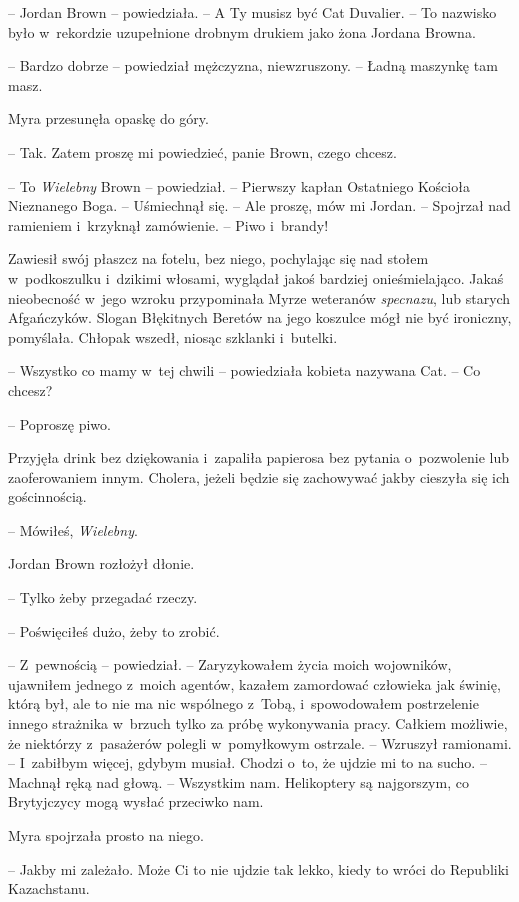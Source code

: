 \documentclass[oneside,polish,11pt,sfheadings]{mwbk}
\begin{document}
-- Jordan Brown -- powiedziała. -- A Ty musisz być Cat Duvalier. -- To
nazwisko było w~rekordzie uzupełnione drobnym drukiem jako żona Jordana
Browna.

-- Bardzo dobrze -- powiedział mężczyzna, niewzruszony. -- Ładną maszynkę
tam masz.

Myra przesunęła opaskę do góry. 

-- Tak. Zatem proszę mi powiedzieć, panie
Brown, czego chcesz.

-- To \textit{Wielebny }Brown -- powiedział. -- Pierwszy kapłan Ostatniego
Kościoła Nieznanego Boga. -- Uśmiechnął się. -- Ale proszę, mów mi Jordan.
-- Spojrzał nad ramieniem i~krzyknął zamówienie. -- Piwo i~brandy!

Zawiesił swój płaszcz na fotelu, bez niego, pochylając się nad stołem w~podkoszulku i~dzikimi włosami, wyglądał jakoś bardziej onieśmielająco.
Jakaś nieobecność w~jego wzroku przypominała Myrze weteranów
\textit{specnazu}, lub starych Afgańczyków. Slogan Błękitnych Beretów na
jego koszulce mógł nie być ironiczny, pomyślała. Chłopak wszedł, niosąc
szklanki i~butelki.

-- Wszystko co mamy w~tej chwili -- powiedziała kobieta nazywana Cat. -- Co
chcesz?

-- Poproszę piwo.

Przyjęła drink bez dziękowania i~zapaliła papierosa bez pytania o~pozwolenie lub zaoferowaniem innym. Cholera, jeżeli będzie się
zachowywać jakby cieszyła się ich gościnnością.

-- Mówiłeś, \textit{Wielebny}.

Jordan Brown rozłożył dłonie. 

-- Tylko żeby przegadać rzeczy.

-- Poświęciłeś dużo, żeby to zrobić.

-- Z~pewnością -- powiedział. -- Zaryzykowałem życia moich wojowników,
ujawniłem jednego z~moich agentów, kazałem zamordować człowieka jak
świnię, którą był, ale to nie ma nic wspólnego z~Tobą, i~spowodowałem
postrzelenie innego strażnika w~brzuch tylko za próbę wykonywania pracy.
Całkiem możliwie, że niektórzy z~pasażerów polegli w~pomyłkowym
ostrzale. -- Wzruszył ramionami. -- I~zabiłbym więcej, gdybym musiał.
Chodzi o~to, że ujdzie mi to na sucho. -- Machnął ręką nad głową. -- Wszystkim nam. Helikoptery są najgorszym, co Brytyjczycy mogą wysłać
przeciwko nam.

Myra spojrzała prosto na niego. 

-- Jakby mi zależało. Może Ci to nie
ujdzie tak lekko, kiedy to wróci do Republiki Kazachstanu.
\end{document}
